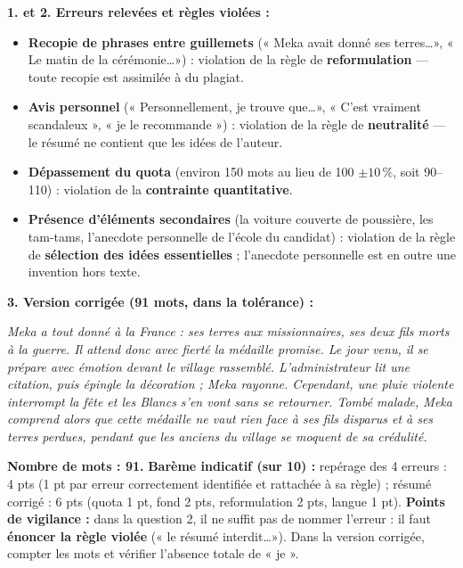 \documentclass[11pt]{article}
\begin{document}
\begin{corrige}
\textbf{1. et 2. Erreurs relevées et règles violées :}
\begin{itemize}
\item \textbf{Recopie de phrases entre guillemets} (« Meka avait donné ses terres\ldots », « Le matin de la cérémonie\ldots ») : violation de la règle de \textbf{reformulation} --- toute recopie est assimilée à du plagiat.
\item \textbf{Avis personnel} (« Personnellement, je trouve que\ldots », « C'est vraiment scandaleux », « je le recommande ») : violation de la règle de \textbf{neutralité} --- le résumé ne contient que les idées de l'auteur.
\item \textbf{Dépassement du quota} (environ 150 mots au lieu de 100 $\pm 10\,\%$, soit 90--110) : violation de la \textbf{contrainte quantitative}.
\item \textbf{Présence d'éléments secondaires} (la voiture couverte de poussière, les tam-tams, l'anecdote personnelle de l'école du candidat) : violation de la règle de \textbf{sélection des idées essentielles} ; l'anecdote personnelle est en outre une invention hors texte.
\end{itemize}
\textbf{3. Version corrigée (91 mots, dans la tolérance) :}

\emph{Meka a tout donné à la France : ses terres aux missionnaires, ses deux fils morts à la guerre. Il attend donc avec fierté la médaille promise. Le jour venu, il se prépare avec émotion devant le village rassemblé. L'administrateur lit une citation, puis épingle la décoration ; Meka rayonne. Cependant, une pluie violente interrompt la fête et les Blancs s'en vont sans se retourner. Tombé malade, Meka comprend alors que cette médaille ne vaut rien face à ses fils disparus et à ses terres perdues, pendant que les anciens du village se moquent de sa crédulité.}

\textbf{Nombre de mots : 91.}
\textbf{Barème indicatif (sur 10) :} repérage des 4 erreurs : 4 pts (1 pt par erreur correctement identifiée et rattachée à sa règle) ; résumé corrigé : 6 pts (quota 1 pt, fond 2 pts, reformulation 2 pts, langue 1 pt).
\textbf{Points de vigilance :} dans la question 2, il ne suffit pas de nommer l'erreur : il faut \textbf{énoncer la règle violée} (« le résumé interdit\ldots »). Dans la version corrigée, compter les mots et vérifier l'absence totale de « je ».
\end{corrige}
\end{document}
